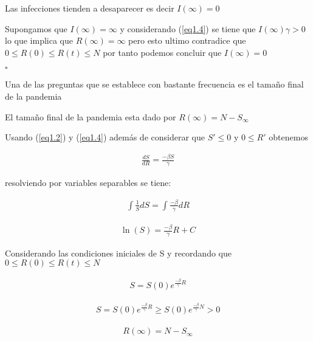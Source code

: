 \begin{Af}
Las infecciones tienden a desaparecer es decir $I(\infty) = 0$
\end{Af}

\begin{Dem}

Supongamos que $I(\infty) = \infty$ y considerando (\ref{eq1.4}) se tiene que $I(\infty) \gamma > 0$ lo que implica que $R(\infty) = \infty$ pero esto ultimo contradice que $0 \leq R(0) \leq R(t) \leq N$  por tanto podemos concluir que $I(\infty) = 0$

\end{Dem}

\hfill	$\square$

Una de las preguntas que se establece con bastante frecuencia es el tamaño final de la pandemia %

\begin{Af}
El tamaño final de la pandemia esta dado por $R(\infty) = N - S_{\infty}$
\end{Af}

\begin{Dem}

Usando (\ref{eq1.2}) y (\ref{eq1.4}) además de considerar que $S' \leq 0$ y $0 \leq R'$ obtenemos 

\begin{align*}
\frac{dS}{dR} = \frac{-\beta S}{\gamma}
\end{align*}

resolviendo por variables separables se tiene:

\begin{align*}
\int \frac{1}{S} dS = \int \frac{-\beta}{\gamma} dR 
\end{align*}

\begin{align*}
\ln(S) = \frac{-\beta}{\gamma} R + C
\end{align*}

Considerando las condiciones iniciales de S y recordando que $0 \leq R(0) \leq R(t) \leq N$

\begin{align*}
S = S(0) e^{\frac{-\beta}{\gamma}R}
\end{align*}

\begin{align*}
S = S(0) e^{\frac{-\beta}{\gamma}R} \geq S(0) e^{\frac{-\beta}{\gamma}N} > 0
\end{align*}

\begin{align*}
R(\infty) = N - S_{\infty}
\end{align*}

\end{Dem}

